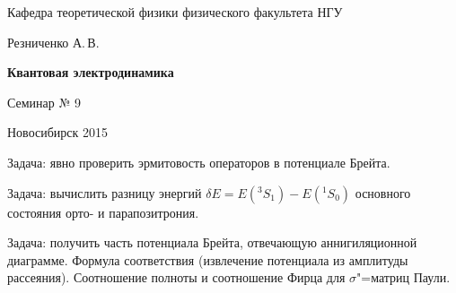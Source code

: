 \documentclass[12pt,pagesize,paper=landscape,paper=192mm:108mm]{scrbook}
\begin{document}
\begin{titlepage}
\begin{center}
    Кафедра теоретической физики физического факультета НГУ
    \medskip

    \Large
    Резниченко А.\,В.
    \bigskip

    \huge
    \textbf{Квантовая электродинамика}
    \bigskip

    \Large
    Семинар № 9
    \vfill

    \normalsize
    \vfill

    \normalsize \ccbysa\hspace{0.5em}  Новосибирск 2015
  \end{center}
\end{titlepage}
\newpage

\vspace*{-1em}
\begin{center}
\vfill
  \begin{minipage}{0.65\linewidth}
    Задача: явно проверить эрмитовость операторов в потенциале Брейта.
    \smallskip

    Задача: вычислить разницу энергий $\delta E=E({}^3S_1)-E({}^1S_0)$
    основного состояния орто- и парапозитрония.
    \smallskip

    Задача: получить часть потенциала Брейта, отвечающую
    аннигиляционной диаграмме. Формула соответствия (извлечение
    потенциала из амплитуды рассеяния). Соотношение полноты и
    соотношение Фирца для $\sigma$"=матриц Паули.

  \end{minipage}
  \vfill

\end{center}
\end{document}

